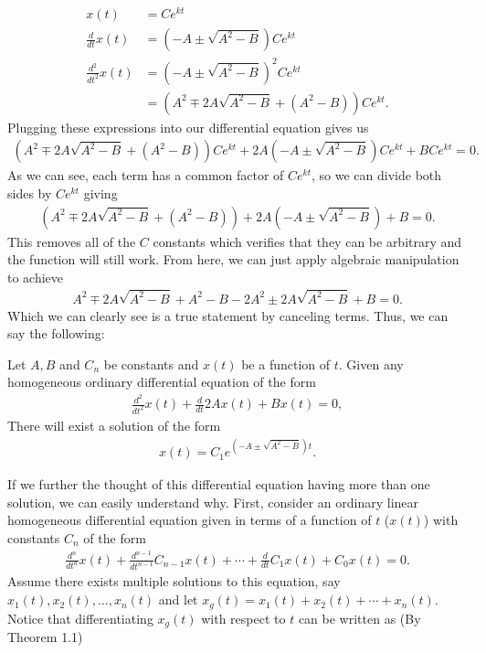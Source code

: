 \begin{align}
x(t)&=Ce^{kt} \\
\frac{d}{dt}x(t)&=(-A\pm\sqrt{A^2-B})Ce^{kt} \\
\frac{d^2}{dt^2}x(t)&=(-A\pm\sqrt{A^2-B})^2Ce^{kt} \\
&= (A^2\mp2A\sqrt{A^2-B}+(A^2-B))Ce^{kt}.
\end{align}
Plugging these expressions into our differential equation gives us
\begin{align}
(A^2\mp2A\sqrt{A^2-B}+(A^2-B))Ce^{kt}+2A(-A\pm\sqrt{A^2-B})Ce^{kt}+BCe^{kt}=0.
\end{align}
As we can see, each term has a common factor of $Ce^{kt}$, so we can divide both sides by $Ce^{kt}$ giving
\begin{align}
(A^2\mp2A\sqrt{A^2-B}+(A^2-B))+2A(-A\pm\sqrt{A^2-B})+B=0.
\end{align}
This removes all of the $C$ constants which verifies that they can be arbitrary and the function will still work. From here, we can just apply algebraic manipulation to achieve
\begin{align}
A^2\mp 2A\sqrt{A^2-B}+A^2-B-2A^2\pm2A\sqrt{A^2-B}+B=0.
\end{align}
Which we can clearly see is a true statement by canceling terms. Thus, we can say the following:
\begin{theo}{}
	Let $A,B$ and $C_n$ be constants and $x(t)$ be a function of $t$. Given any homogeneous ordinary differential equation of the form
	\begin{align*}
	\frac{d^2}{dt^2}x(t)+\frac{d}{dt}2Ax(t)+Bx(t)=0,
	\end{align*}
	There will exist a solution of the form
	\begin{align*}
	x(t)=C_1e^{(-A\pm\sqrt{A^2-B})t}.
	\end{align*}
\end{theo}
If we further the thought of this differential equation having more than one solution, we can easily understand why. First, consider an ordinary linear homogeneous differential equation given in terms of a function of $t$ ($x(t)$) with constants $C_n$ of the form
\begin{align}
\frac{d^n}{dt^n}x(t)+\frac{d^{n-1}}{dt^{n-1}}C_{n-1}x(t)+\cdots+\frac{d}{dt}C_1x(t)+C_0x(t)=0.
\end{align}
Assume there exists multiple solutions to this equation, say $x_1(t),x_2(t),\dots,x_n(t)$ and let $x_g(t)=x_1(t)+x_2(t)+\cdots+x_n(t)$. Notice that differentiating $x_g(t)$ with respect to $t$ can be written as (By Theorem 1.1)
